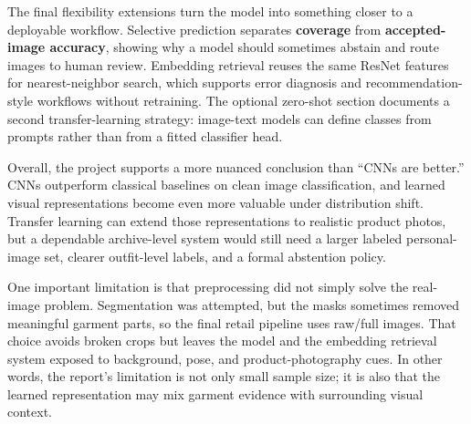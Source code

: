 \documentclass[11pt]{article}
\begin{document}
The final flexibility extensions turn the model into something closer to
a deployable workflow. Selective prediction separates \textbf{coverage}
from \textbf{accepted-image accuracy}, showing why a model should
sometimes abstain and route images to human review. Embedding retrieval
reuses the same ResNet features for nearest-neighbor search, which
supports error diagnosis and recommendation-style workflows without
retraining. The optional zero-shot section documents a second
transfer-learning strategy: image-text models can define classes from
prompts rather than from a fitted classifier head.

Overall, the project supports a more nuanced conclusion than ``CNNs are
better.'' CNNs outperform classical baselines on clean image
classification, and learned visual representations become even more
valuable under distribution shift. Transfer learning can extend those
representations to realistic product photos, but a dependable
archive-level system would still need a larger labeled personal-image
set, clearer outfit-level labels, and a formal abstention policy.

One important limitation is that preprocessing did not simply solve the
real-image problem. Segmentation was attempted, but the masks sometimes
removed meaningful garment parts, so the final retail pipeline uses
raw/full images. That choice avoids broken crops but leaves the model
and the embedding retrieval system exposed to background, pose, and
product-photography cues. In other words, the report's limitation is not
only small sample size; it is also that the learned representation may
mix garment evidence with surrounding visual context.
\end{document}
